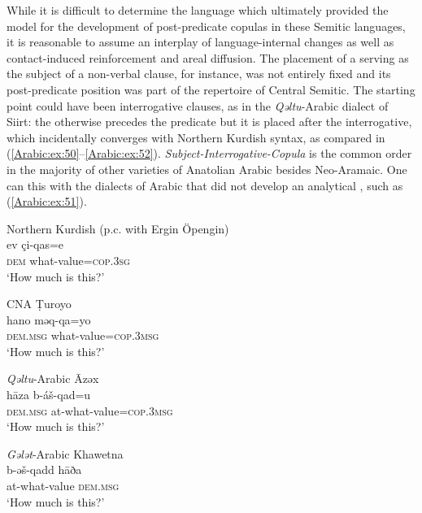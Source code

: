 \documentclass[output=paper,colorlinks,citecolor=brown,draftmode]{langscibook}
\begin{document}
While it is difficult to determine the language which ultimately provided the model for the development of post-predicate copulas in these Semitic languages, it is reasonable to assume an interplay of language-internal changes as well as contact-induced reinforcement and areal diffusion. The placement of a  serving as the subject of a non-verbal clause, for instance, was not entirely fixed and its post-predicate position was part of the repertoire of Central Semitic. The starting point could have been interrogative clauses, as in the \textit{Qəltu}-Arabic dialect of Siirt: the  otherwise precedes the predicate but it is placed after the interrogative, which incidentally converges with Northern Kurdish syntax, as compared in (\ref{Arabic:ex:50}--\ref{Arabic:ex:52}). \textit{Subject-Interrogative-Copula} is the common order in the majority of other varieties of Anatolian Arabic besides Neo-Aramaic. One can  this with the dialects of Arabic that did not develop an analytical , such as (\ref{Arabic:ex:51}).

\newpage
\ea\label{Arabic:ex:50}
Northern Kurdish (p.c. with Ergin Öpengin)\\
\gll ev çi-qas=e \\
\textsc{dem} what-value\textsc{=cop.3sg} \\
\glt `How much is this?'
\z

\ea\label{Arabic:ex:ad4}
CNA Ṭuroyo \\
\gll hano məq-qa=yo \\
\textsc{dem.msg} what-value\textsc{=cop.3msg} \\
\glt `How much is this?'
\z

\ea\label{Arabic:ex:51}
\textit{Qəltu}-Arabic Āzəx \citep[135]{Jastrow1978MAqetlu1} \\
\gll hāza b-áš-qad=u \\
\textsc{dem.msg} at-what-value\textsc{=cop.3msg} \\
\glt `How much is this?'
\z

\ea\label{Arabic:ex:52}
\textit{Gələt}-Arabic Khawetna \citep[54]{Talay1999AKhawetnaG} \\
\gll b-əš-qadd hāða \\
at-what-value \textsc{dem.msg} \\
\glt `How much is this?'
\z
\end{document}
